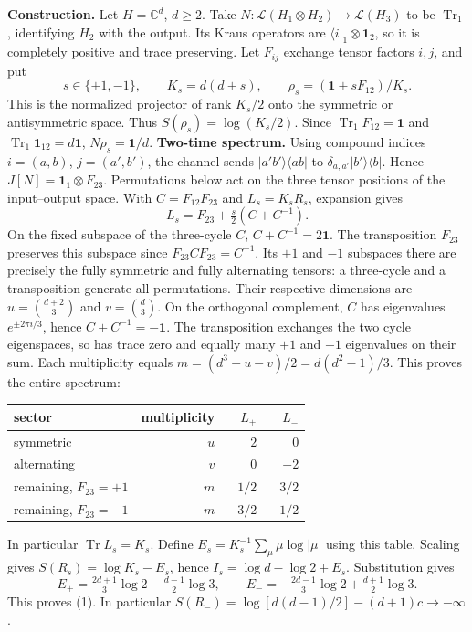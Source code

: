 \documentclass[11pt]{article}
\newcommand{\tr}{\operatorname{Tr}}
\newcommand{\id}{\mathbf1}
\begin{document}
\textbf{Construction.} Let $H=\mathbb C^d$, $d\ge2$. Take $N:\mathcal L(H_1\otimes H_2)\to\mathcal L(H_3)$ to be $\tr_1$, identifying $H_2$ with the output. Its Kraus operators are $\langle i|_1\otimes\id_2$, so it is completely positive and trace preserving. Let $F_{ij}$ exchange tensor factors $i,j$, and put
\[
  s\in\{+1,-1\},\qquad K_s=d(d+s),\qquad \rho_s=(\id+s F_{12})/K_s .
\]
This is the normalized projector of rank $K_s/2$ onto the symmetric or antisymmetric space. Thus $S(\rho_s)=\log(K_s/2)$. Since $\tr_1 F_{12}=\id$ and $\tr_1\id_{12}=d\id$, $N\rho_s=\id/d$.
\newpage
\textbf{Two-time spectrum.} Using compound indices $i=(a,b)$, $j=(a',b')$, the channel sends $|a'b'\rangle\langle ab|$ to $\delta_{a,a'}|b'\rangle\langle b|$. Hence $J[N]=\id_1\otimes F_{23}$. Permutations below act on the three tensor positions of the input--output space. With $C=F_{12}F_{23}$ and $L_s=K_sR_s$, expansion gives
\[
 L_s=F_{23}+\tfrac{s}{2}(C+C^{-1}).\tag{2}
\]
On the fixed subspace of the three-cycle $C$, $C+C^{-1}=2\id$. The transposition $F_{23}$ preserves this subspace since $F_{23}CF_{23}=C^{-1}$. Its $+1$ and $-1$ subspaces there are precisely the fully symmetric and fully alternating tensors: a three-cycle and a transposition generate all permutations. Their respective dimensions are $u=\binom{d+2}{3}$ and $v=\binom{d}{3}$. On the orthogonal complement, $C$ has eigenvalues $e^{\pm2\pi i/3}$, hence $C+C^{-1}=-\id$. The transposition exchanges the two cycle eigenspaces, so has trace zero and equally many $+1$ and $-1$ eigenvalues on their sum. Each multiplicity equals $m=(d^3-u-v)/2=d(d^2-1)/3$. This proves the entire spectrum:
\begin{center}\begin{tabular}{lrrr}\toprule
sector & multiplicity & $L_+$ & $L_-$\\\midrule
symmetric & $u$ & $2$ & $0$\\
alternating & $v$ & $0$ & $-2$\\
remaining, $F_{23}=+1$ & $m$ & $1/2$ & $3/2$\\
remaining, $F_{23}=-1$ & $m$ & $-3/2$ & $-1/2$\\\bottomrule
\end{tabular}\end{center}
In particular $\tr L_s=K_s$. Define $E_s=K_s^{-1}\sum_\mu\mu\log|\mu|$ using this table. Scaling gives $S(R_s)=\log K_s-E_s$, hence $I_s=\log d-\log2+E_s$. Substitution gives
\[
 E_+=\tfrac{2d+1}{3}\log2-\tfrac{d-1}{2}\log3,\qquad
 E_-=-\tfrac{2d-1}{3}\log2+\tfrac{d+1}{2}\log3.
\]
This proves (1). In particular $S(R_-)=\log[d(d-1)/2]-(d+1)c\to-\infty$.
\end{document}

